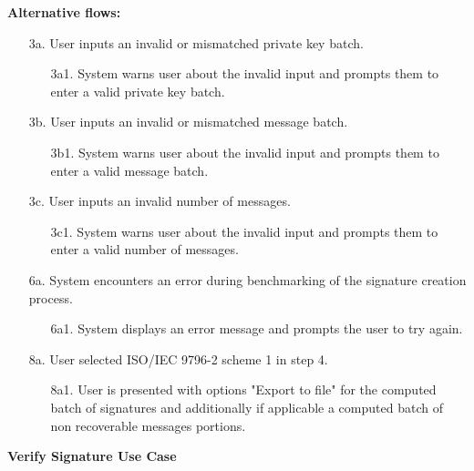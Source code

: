 \documentclass[]{final_report}
\theoremstyle{definition}
\begin{document}
\noindent\textbf{Alternative flows:}
\begin{enumerate}
    \item[3a.] User inputs an invalid or mismatched private key batch.
    \begin{enumerate}
        \item[3a1.] System warns user about the invalid input and prompts them to enter a valid private key batch.
    \end{enumerate}
     \item[3b.] User inputs an invalid or mismatched message batch.
    \begin{enumerate}
        \item[3b1.] System warns user about the invalid input and prompts them to enter a valid message batch.
    \end{enumerate}
     \item[3c.] User inputs an invalid number of messages.
    \begin{enumerate}
        \item[3c1.] System warns user about the invalid input and prompts them to enter a valid number of messages.
    \end{enumerate}
    \item[6a.] System encounters an error during benchmarking of the signature creation process.
    \begin{enumerate}
        \item[6a1.] System displays an error message and prompts the user to try again.
    \end{enumerate}
    \item[8a.]  User selected ISO\slash IEC 9796-2 scheme 1 in step 4.
    \begin{enumerate}
        \item[8a1.] User is presented with options "Export to file" for the computed batch of signatures and additionally if applicable a computed batch of non recoverable messages portions.
    \end{enumerate}
\end{enumerate}

\textbf{Verify Signature Use Case}
\end{document}
